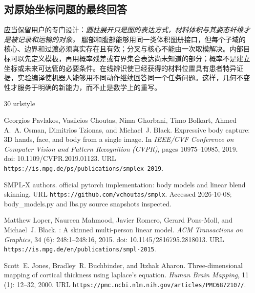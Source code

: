 \documentclass[11pt,a4paper]{article}
\numberwithin{equation}{section}
\theoremstyle{definition}
\begin{document}
\subsection{对原始坐标问题的最终回答}
应当保留用户的专门设计：\emph{圆柱展开只是图的表达方式，材料体积与其姿态纤维才是被记录和运输的对象。} 腿部和腹部能够用同一类体积图册接口，但每个子域的核心、边界和过渡必须真实存在且有效；分叉与核心不能由一次取模解决。内部目标可以先定义模板，再用概率残差或有界集合表达尚未知道的部分；概率不是建立坐标或未来可达管的必要条件。在线辨识使已经获得的材料位置具有患者特异证据，实验编译使机器人能够用不同动作继续回答同一个任务问题。这样，几何不变性才服务于明确的新能力，而不止是数学上的重写。


\clearpage
\begin{thebibliography}{30}
\providecommand{\natexlab}[1]{#1}
\providecommand{\url}[1]{\texttt{#1}}
\expandafter\ifx\csname urlstyle\endcsname\relax
  \providecommand{\doi}[1]{doi: #1}\else
  \providecommand{\doi}{doi: \begingroup \urlstyle{rm}\Url}\fi

Georgios Pavlakos, Vasileios Choutas, Nima Ghorbani, Timo Bolkart, Ahmed A.~A.
  Osman, Dimitrios Tzionas, and Michael~J. Black.
\newblock Expressive body capture: {3D} hands, face, and body from a single
  image.
\newblock In \emph{IEEE/CVF Conference on Computer Vision and Pattern
  Recognition (CVPR)}, pages 10975--10985, 2019.
\newblock \doi{10.1109/CVPR.2019.01123}.
\newblock URL \url{https://is.mpg.de/ps/publications/smplex-2019}.

{SMPL-X authors}.
 official pytorch implementation: body models and linear
  blend skinning.
\newblock URL \url{https://github.com/vchoutas/smplx}.
\newblock Accessed 2026-10-08; body\_models.py and lbs.py source snapshots
  inspected.

Matthew Loper, Naureen Mahmood, Javier Romero, Gerard Pons-Moll, and Michael~J.
  Black.
: A skinned multi-person linear model.
\newblock \emph{ACM Transactions on Graphics}, 34 (6):
  248:1--248:16, 2015.
\newblock \doi{10.1145/2816795.2818013}.
\newblock URL \url{https://is.mpg.de/en/publications/smpl-2015}.

Scott~E. Jones, Bradley~R. Buchbinder, and Itzhak Aharon.
\newblock Three-dimensional mapping of cortical thickness using laplace's
  equation.
\newblock \emph{Human Brain Mapping}, 11 (1): 12--32, 2000.
\newblock URL \url{https://pmc.ncbi.nlm.nih.gov/articles/PMC6872107/}.


\end{thebibliography}
\end{document}
